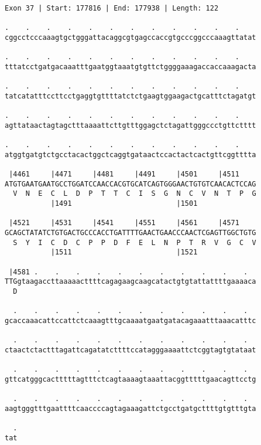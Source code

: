 \documentclass{article}
\begin{document}
\begin{Verbatim}
Exon 37 | Start: 177816 | End: 177938 | Length: 122
 
.    .    .    .    .    .    .    .    .    .    .    .    
cggcctcccaaagtgctgggattacaggcgtgagccaccgtgcccggcccaaagttatat
  
.    .    .    .    .    .    .    .    .    .    .    .    
tttatcctgatgacaaatttgaatggtaaatgtgttctggggaaagaccaccaaagacta
  
.    .    .    .    .    .    .    .    .    .    .    .    
tatcatatttccttcctgaggtgttttatctctgaagtggaagactgcatttctagatgt
  
.    .    .    .    .    .    .    .    .    .    .    .    
agttataactagtagctttaaaattcttgtttggagctctagattgggccctgttctttt
  
.    .    .    .    .    .    .    .    .    .    .    .    
atggtgatgtctgcctacactggctcaggtgataactccactactcactgttcggtttta
  
 |4461     |4471     |4481     |4491     |4501     |4511    
ATGTGAATGAATGCCTGGATCCAACCACGTGCATCAGTGGGAACTGTGTCAACACTCCAG
  V  N  E  C  L  D  P  T  T  C  I  S  G  N  C  V  N  T  P  G
           |1491                         |1501              
  
 |4521     |4531     |4541     |4551     |4561     |4571    
GCAGCTATATCTGTGACTGCCCACCTGATTTTGAACTGAACCCAACTCGAGTTGGCTGTG
  S  Y  I  C  D  C  P  P  D  F  E  L  N  P  T  R  V  G  C  V
           |1511                         |1521              
  
 |4581 .    .    .    .    .    .    .    .    .    .    .  
TTGgtaagaccttaaaaacttttcagagaagcaagcatactgtgtattattttgaaaaca
  D                                                         
  
  .    .    .    .    .    .    .    .    .    .    .    .  
gcaccaaacattccattctcaaagtttgcaaaatgaatgatacagaaatttaaacatttc
  
  .    .    .    .    .    .    .    .    .    .    .    .  
ctaactctactttagattcagatatcttttccatagggaaaattctcggtagtgtataat
  
  .    .    .    .    .    .    .    .    .    .    .    .  
gttcatgggcactttttagtttctcagtaaaagtaaattacggtttttgaacagttcctg
  
  .    .    .    .    .    .    .    .    .    .    .    .  
aagtgggtttgaattttcaaccccagtagaaagattctgcctgatgcttttgtgtttgta
  
  .
tat
\end{Verbatim}
\newpage
\end{document}
